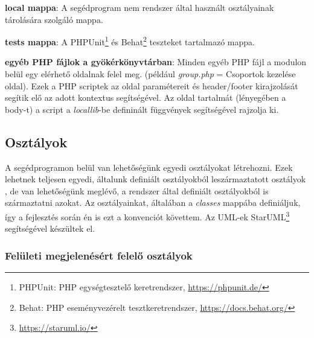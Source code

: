 \begin{compactitem}
\begin{compactitem}
        \item \textbf{local mappa}: A segédprogram nem rendszer által használt osztályainak tárolására szolgáló mappa.
    \end{compactitem}
    \item \textbf{tests mappa}: A PHPUnit\footnote{PHPUnit: PHP egységtesztelő keretrendszer, \url{https://phpunit.de/}} és Behat\footnote{Behat: PHP eseményvezérelt tesztkeretrendszer, \url{https://docs.behat.org/}} teszteket tartalmazó mappa.
    \item \textbf{egyéb PHP fájlok a gyökérkönyvtárban}: Minden egyéb PHP fájl a modulon belül egy elérhető oldalnak felel meg. (például \textit{group.php} = Csoportok kezelése oldal). Ezek a PHP scriptek az oldal paramétereit és header/footer kirajzolását segítik elő az adott kontextus segítségével. Az oldal tartalmát (lényegében a body-t) a script a \textit{locallib}-be defininált függvények segítségével rajzolja ki.
\end{compactitem}


\subsection{Osztályok}

A segédprogramon belül van lehetőségünk egyedi osztályokat létrehozni. Ezek lehetnek teljesen egyedi, általunk definiált osztályokból leszármaztatott osztályok , de van lehetőségünk meglévő, a rendszer által definiált osztályokból is származtatni azokat. Az osztályainkat, általában a \textit{classes} mappába definiáljuk, így a fejlesztés során én is ezt a konvenciót követtem. Az UML-ek StarUML\footnote{\url{https://staruml.io/}} segítségével készültek el.

\subsubsection{Felületi megjelenésért felelő osztályok}

